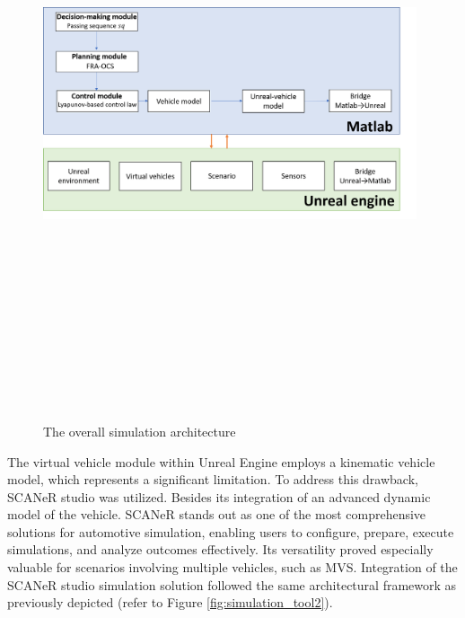         \begin{figure}[!h]
        \centering 
        \includegraphics[width=11cm,height=18cm,keepaspectratio]{appendices/Slide_sup1.png}
        \caption{The overall simulation architecture  }
        \label{fig:simulation_tool1}
        \end{figure}

The virtual vehicle module within Unreal Engine employs a kinematic vehicle model, which represents a significant limitation. To address this drawback, SCANeR studio was utilized. Besides its integration of an advanced dynamic model of the vehicle. SCANeR stands out as one of the most comprehensive solutions for automotive simulation, enabling users to configure, prepare, execute simulations, and analyze outcomes effectively. Its versatility proved especially valuable for scenarios involving multiple vehicles, such as MVS. Integration of the SCANeR studio simulation solution followed the same architectural framework as previously depicted (refer to Figure \ref{fig:simulation_tool2}).

